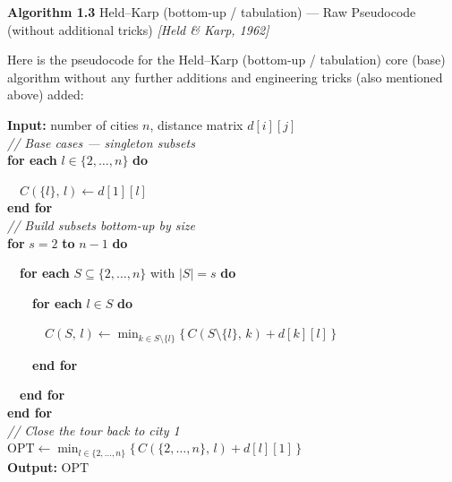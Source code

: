 \documentclass[11pt]{article}
\begin{document}
    \label{pseudo-1-3}

    \begin{pseudobox}

\textbf{Algorithm 1.3} Held--Karp (bottom-up / tabulation) --- Raw
Pseudocode (without additional tricks) \emph{{[}Held \& Karp, 1962{]}}

\tcbline

Here is the pseudocode for the Held--Karp (bottom-up / tabulation) core
(base) algorithm without any further additions and engineering tricks
(also mentioned above) added:

\textbf{Input:} number of cities \(n\), distance matrix \(d[i][j]\)\\
\emph{// Base cases --- singleton subsets}\\
\textbf{for each} \(l \in \{2, \ldots, n\}\) \textbf{do}\\
\strut ~~\(C(\{l\},\, l) \leftarrow d[1][l]\)\\
\textbf{end for}\\
\emph{// Build subsets bottom-up by size}\\
\textbf{for} \(s = 2\) \textbf{to} \(n - 1\) \textbf{do}\\
\strut ~~\textbf{for each} \(S \subseteq \{2, \ldots, n\}\) with
\(|S| = s\) \textbf{do}\\
\strut ~~~~\textbf{for each} \(l \in S\) \textbf{do}\\
\strut ~~~~~~\(C(S,\, l) \leftarrow \displaystyle\min_{k \in S \setminus \{l\}} \bigl\{\, C(S \setminus \{l\},\, k) + d[k][l] \,\bigr\}\)\\
\strut ~~~~\textbf{end for}\\
\strut ~~\textbf{end for}\\
\textbf{end for}\\
\emph{// Close the tour back to city 1}\\
\(\text{OPT} \leftarrow \displaystyle\min_{l \in \{2, \ldots, n\}} \bigl\{\, C(\{2, \ldots, n\},\, l) + d[l][1] \,\bigr\}\)\\
\textbf{Output:} \(\text{OPT}\)

\end{pseudobox}
\end{document}
